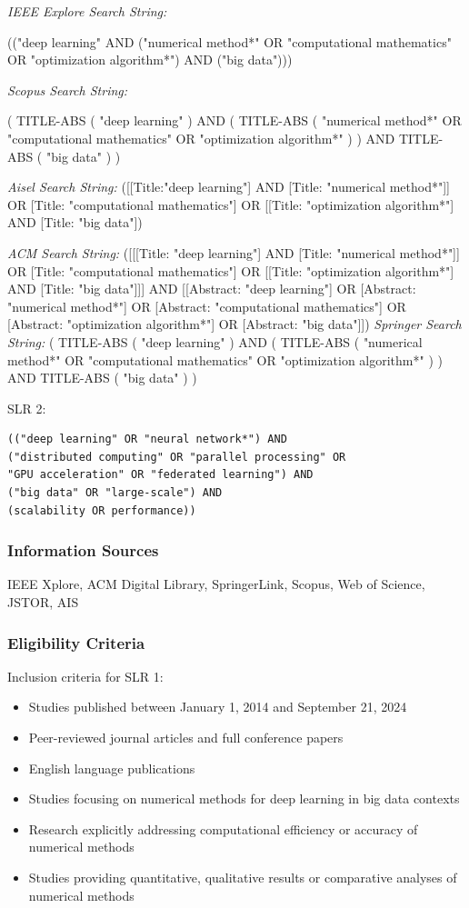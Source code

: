 \documentclass[a4paper,12pt]{article}
\begin{document}
\emph{IEEE Explore Search String:}

(("deep learning" AND ("numerical method*" OR "computational mathematics" OR "optimization algorithm*") AND ("big data")))

\emph{Scopus Search String:}

( TITLE-ABS ( "deep learning" ) AND ( TITLE-ABS ( "numerical method*" OR "computational mathematics" OR "optimization algorithm*" ) ) AND TITLE-ABS ( "big data" ) )

\emph{Aisel Search String:}
([[Title:"deep learning"] AND [Title: "numerical method*"]] OR [Title: "computational mathematics"] OR [[Title: "optimization algorithm*"] AND [Title: "big data"])

\emph{ACM Search String:}
([[[Title: "deep learning"] AND [Title: "numerical method*"]] OR [Title: "computational mathematics"] OR [[Title: "optimization algorithm*"] AND [Title: "big data"]]] AND [[Abstract: "deep learning"] OR [Abstract: "numerical method*"] OR [Abstract: "computational mathematics"] OR [Abstract: "optimization algorithm*"] OR [Abstract: "big data"]])
\emph{Springer Search String:}
( TITLE-ABS ( "deep learning" ) AND ( TITLE-ABS ( "numerical method*" OR "computational mathematics" OR "optimization algorithm*" ) ) AND TITLE-ABS ( "big data" ) )

\vline

SLR 2:
\begin{verbatim}
(("deep learning" OR "neural network*") AND 
("distributed computing" OR "parallel processing" OR 
"GPU acceleration" OR "federated learning") AND 
("big data" OR "large-scale") AND 
(scalability OR performance))
\end{verbatim}

\subsubsection{Information Sources}
IEEE Xplore, ACM Digital Library, SpringerLink, Scopus, Web of Science, JSTOR, AIS 

\subsubsection{Eligibility Criteria}
Inclusion criteria for SLR 1:
\begin{itemize}
    \item Studies published between January 1, 2014 and September 21, 2024
    \item Peer-reviewed journal articles and full conference papers
    \item English language publications
    \item Studies focusing on numerical methods for deep learning in big data contexts
    \item Research explicitly addressing computational efficiency or accuracy of numerical methods
    \item Studies providing quantitative, qualitative results or comparative analyses of numerical methods
\end{itemize}
\end{document}
